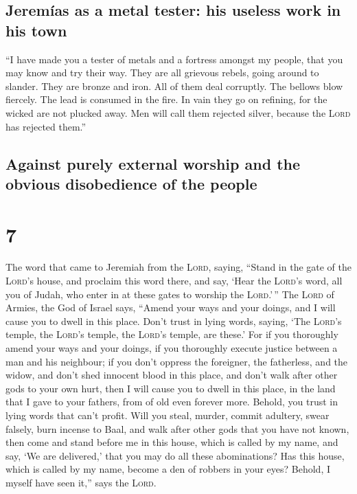 \hypertarget{jeremuxedas-as-a-metal-tester-his-useless-work-in-his-town}{%
\subsection{Jeremías as a metal tester: his useless work in his
town}\label{jeremuxedas-as-a-metal-tester-his-useless-work-in-his-town}}

 ``I have made you a tester of metals and a fortress
amongst my people, that you may know and try their way. 
They are all grievous rebels, going around to slander. They are bronze
and iron. All of them deal corruptly.  The bellows blow
fiercely. The lead is consumed in the fire. In vain they go on refining,
for the wicked are not plucked away.  Men will call them
rejected silver, because the \textsc{Lord} has rejected them.''

\hypertarget{against-purely-external-worship-and-the-obvious-disobedience-of-the-people}{%
\subsection{Against purely external worship and the obvious disobedience
of the
people}\label{against-purely-external-worship-and-the-obvious-disobedience-of-the-people}}

\hypertarget{section-6}{%
\section{7}\label{section-6}}

 The word that came to Jeremiah from the \textsc{Lord},
saying,  ``Stand in the gate of the \textsc{Lord}'s house,
and proclaim this word there, and say, `Hear the \textsc{Lord}'s word,
all you of Judah, who enter in at these gates to worship the
\textsc{Lord}.'\,''  The \textsc{Lord} of Armies, the God
of Israel says, ``Amend your ways and your doings, and I will cause you
to dwell in this place.  Don't trust in lying words,
saying, `The \textsc{Lord}'s temple, the \textsc{Lord}'s temple, the
\textsc{Lord}'s temple, are these.'  For if you thoroughly
amend your ways and your doings, if you thoroughly execute justice
between a man and his neighbour;  if you don't oppress the
foreigner, the fatherless, and the widow, and don't shed innocent blood
in this place, and don't walk after other gods to your own hurt,
 then I will cause you to dwell in this place, in the land
that I gave to your fathers, from of old even forever more.
 Behold, you trust in lying words that can't profit.
 Will you steal, murder, commit adultery, swear falsely,
burn incense to Baal, and walk after other gods that you have not known,
 then come and stand before me in this house, which is
called by my name, and say, `We are delivered,' that you may do all
these abominations?  Has this house, which is called by
my name, become a den of robbers in your eyes? Behold, I myself have
seen it,'' says the \textsc{Lord}.

